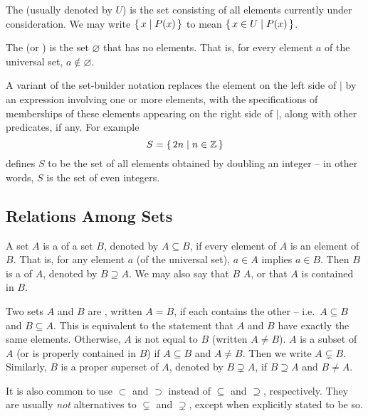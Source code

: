 The  (usually denoted by $U$) is the set consisting of all elements currently under consideration. We may write $\qty{\, x \mid P(x) \,}$ to mean $\qty{\, x \in U \mid P(x) \,}$.

The  (or ) is the set $\varnothing$ that has no elements. That is, for every element $a$ of the universal set, $a \notin \varnothing$.

\begin{Note*}
A variant of the set-builder notation replaces the element on the left side of $\mid$ by an expression involving one or more elements, with the specifications of memberships of these elements appearing on the right side of $\mid$, along with other predicates, if any. For example
\begin{equation*}
S = \qty{\, 2n \mid n \in \mathbb Z \,}
\end{equation*}
defines $S$ to be the set of all elements obtained by doubling an integer -- in other words, $S$ is the set of even integers.
\end{Note*}

\subsection{Relations Among Sets}\label{subsec:SetRels}

A set $A$ is a  of a set $B$, denoted by $A \subseteq B$, if every element of $A$ is an element of $B$. That is, for any element $a$ (of the universal set), $a \in A$ implies $a \in B$. Then $B$ is a  of $A$, denoted by $B \supseteq A$. We may also say that $B$  $A$, or that $A$ is contained in $B$.

Two sets $A$ and $B$ are , written $A = B$, if each contains the other -- i.e.\ $A \subseteq B$ and $B \subseteq A$. This is equivalent to the statement that $A$ and $B$ have exactly the same elements. Otherwise, $A$ is not equal to $B$ (written $A \ne B$). $A$ is a  subset of $A$ (or is properly contained in $B$) if $A \subseteq B$ and $A \ne B$. Then we write $A \subsetneq B$. Similarly, $B$ is a proper superset of $A$, denoted by $B \supsetneq A$, if $B \supseteq A$ and $B \ne A$.

\begin{Note*}
It is also common to use $\subset$ and $\supset$ instead of $\subseteq$ and $\supseteq$, respectively. They are usually \emph{not} alternatives to $\subsetneq$ and $\supsetneq$, except when explicitly stated to be so.
\end{Note*}

